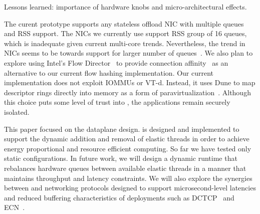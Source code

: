  

\todo Lessons learned: importance of hardware knobs and
micro-architectural effects.  

 The curent prototype
supports any stateless offload NIC with multiple queues and RSS
support. The NICs we currently use support RSS group of 16 queues,
which is inadequate given current multi-core trends. Nevertheless, the
trend in NICs seems to be towards support for larger number of
queues~\cite{refs,nsdi14}. We also plan to explore using Intel's Flow
Director~\cite{intel:82599} to provide connection
affinity~\cite{DBLP:conf/eurosys/PesterevSZM12} as an alternative to
our current flow hashing implementation. Our current implementation
does not exploit IOMMUs or VT-d. Instead, it uses Dune to map
descriptor rings directly into \ix memory as a form of
paravirtualization~\cite{DBLP:conf/sosp/BarhamDFHHHN03}.  Although
this choice puts some level of trust into \ix, the applications remain
securely isolated.  

 This paper focused on the \ix dataplane
design. \ix is designed and implemented to support the dynamic
addition and removal of elastic threads in order to achieve energy
proportional and resource efficient computing. So far we have tested
only static configurations. In future work, we will design a dynamic
runtime that rebalances hardware queues between available elastic
threads in a manner that maintains throughput and latency constraints.
%
We will also explore the synergies between \ix and networking
protocols designed to support microsecond-level latencies and reduced
buffering characteristics of \ix deployments such as
DCTCP~\cite{DBLP:conf/sigcomm/AlizadehGMPPPSS10} and
ECN~\cite{ramakrishnan2001addition}.







